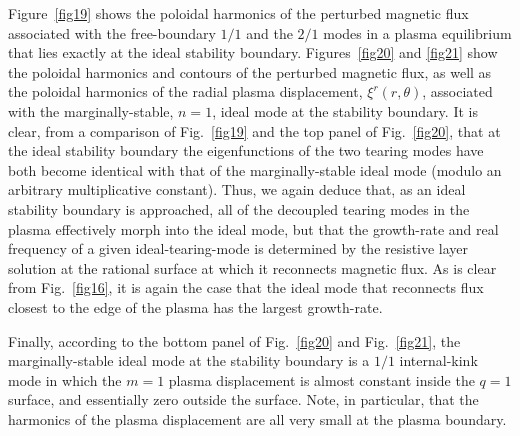 \documentclass[12pt,prb,aps]{revtex4-1}
\begin{document}
Figure~\ref{fig19} shows the poloidal harmonics of the perturbed magnetic flux associated
with the free-boundary $1/1$ and the $2/1$ modes  in a  plasma equilibrium 
that lies exactly at the ideal stability boundary. Figures~\ref{fig20} and \ref{fig21} show the poloidal harmonics and contours of the perturbed magnetic flux, as well
as the poloidal harmonics of the radial
plasma displacement, $\xi^r(r,\theta)$, associated with the marginally-stable, $n=1$, ideal mode at the stability boundary. It is
clear, from a comparison of Fig.~\ref{fig19} and the top panel of Fig.~\ref{fig20}, that at the ideal stability boundary the eigenfunctions of the two
tearing modes have both become identical with that of the marginally-stable ideal mode (modulo an arbitrary multiplicative constant). Thus, we again deduce that, as
an ideal stability boundary is approached, all of the decoupled tearing modes in the plasma 
effectively morph into the ideal mode, but that the growth-rate and real frequency of a given ideal-tearing-mode is determined by the 
resistive layer solution at the rational surface at which it reconnects magnetic flux. As is clear from Fig.~\ref{fig16}, it is again the case that the ideal mode that reconnects flux closest to the edge of the plasma has the largest growth-rate. 

Finally, according to the bottom panel of Fig.~\ref{fig20} and Fig.~\ref{fig21}, the marginally-stable ideal mode at the stability boundary is a $1/1$
internal-kink mode in which the $m=1$ plasma displacement is almost constant inside the $q=1$ surface, and essentially zero
outside the surface.\cite{freidberg,wesson} Note, in particular, that the harmonics of the plasma displacement are all very small at the 
plasma boundary.
\end{document}
